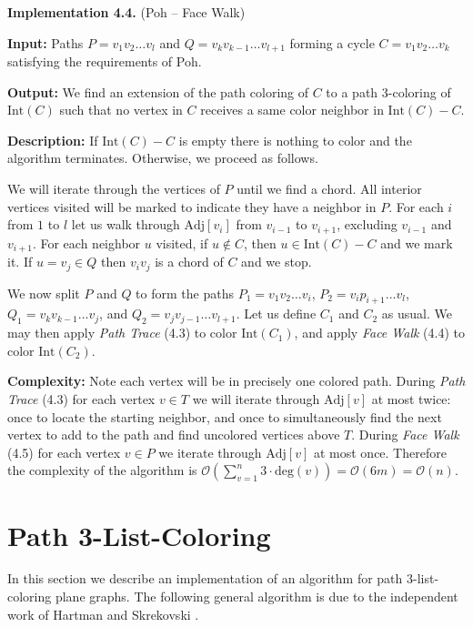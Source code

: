 \documentclass[letterpaper, 12pt]{amsart}
\theoremstyle{definition}
\theoremstyle{definition}
\theoremstyle{thm}
\theoremstyle{definition}
\begin{document}
\noindent\textbf{Implementation 4.4.} (Poh -- Face Walk)

\noindent\textbf{Input:} Paths $P=v_1v_2\ldots v_l$ and
$Q=v_kv_{k-1}\ldots v_{l+1}$ forming a cycle $C=v_1v_2\ldots v_k$ satisfying
the requirements of Poh.

\noindent\textbf{Output:} We find an extension of the path coloring of $C$ to
a path $3$-coloring of $\text{Int}(C)$ such that
no vertex in $C$ receives a same color neighbor in $\text{Int}(C)-C$.

\noindent\textbf{Description:} If $\text{Int}(C)-C$ is empty there is nothing to
color and the algorithm terminates. Otherwise, we proceed as follows.

We will iterate through the vertices of $P$ until we find a chord. All interior
vertices visited will be marked to indicate they have a neighbor in $P$. For
each $i$ from $1$ to $l$ let us walk through
$\text{Adj}[v_i]$ from $v_{i-1}$ to $v_{i+1}$, excluding
$v_{i-1}$ and $v_{i+1}$. For each neighbor $u$ visited,
if $u\not\in C$, then $u\in \text{Int}(C)-C$ and we
mark it. If $u=v_j\in Q$ then $v_iv_j$ is a chord of $C$ and we stop.

We now split $P$ and $Q$ to form the paths
$P_1=v_1v_2\ldots v_i$, $P_2=v_ip_{i+1}\ldots v_l$, $Q_1=v_kv_{k-1}\ldots v_j$,
and $Q_2=v_jv_{j-1}\ldots v_{l+1}$. Let us define $C_1$ and $C_2$ as usual.
We may then apply \textit{Path Trace} (4.3) to color $\text{Int}(C_1)$, and
apply \textit{Face Walk} (4.4) to color $\text{Int}(C_2)$.

\noindent\textbf{Complexity:} Note each vertex will be in precisely one colored
path. During \textit{Path Trace} (4.3) for each vertex $v\in T$ we will iterate through
$\text{Adj}[v]$ at most twice: once to locate the starting neighbor, and once
to simultaneously find the next vertex to add to the path and find uncolored
vertices above $T$. During \textit{Face Walk} (4.5) for each vertex
$v\in P$ we iterate through $\text{Adj}[v]$ at most once. Therefore the complexity of the algorithm is
$\mathcal{O}\left(\sum_{v=1}^n3\cdot\text{deg}(v)\right)=\mathcal{O}(6m)=\mathcal{O}(n)$.



\section{Path 3-List-Coloring}

In this section we describe an implementation of an algorithm for path
$3$-list-coloring plane graphs. The following general algorithm is due to the
independent work of Hartman \cite{hartman} and Skrekovski \cite{skrekovski}.\\
\end{document}
